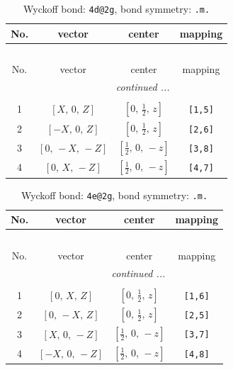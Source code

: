 \documentclass[fleqn,8pt]{jsarticle}
\begin{document}
\begin{longtable}{cccc}
\caption{Wyckoff bond: {\tt 4d@2g}, bond symmetry: {\tt .m.}}
 \\
 \hline \hline
No. & vector & center & mapping \\ \hline \endfirsthead

\multicolumn{3}{l}{\tablename\ \thetable{}} \\
 \hline \hline
No. & vector & center & mapping \\ \hline \endhead

 \hline \hline
\multicolumn{3}{r}{\footnotesize\it continued ...} \\ \endfoot

 \hline \hline
\multicolumn{3}{r}{} \\ \endlastfoot

1 & $\left[ X,\, 0,\, Z \right]$ & $\left[ 0,\, \frac{1}{2},\, z \right]$ & {\tt [1,5]} \\ \hline
2 & $\left[ - X,\, 0,\, Z \right]$ & $\left[ 0,\, \frac{1}{2},\, z \right]$ & {\tt [2,6]} \\ \hline
3 & $\left[ 0,\, - X,\, - Z \right]$ & $\left[ \frac{1}{2},\, 0,\, - z \right]$ & {\tt [3,8]} \\ \hline
4 & $\left[ 0,\, X,\, - Z \right]$ & $\left[ \frac{1}{2},\, 0,\, - z \right]$ & {\tt [4,7]} \\
\end{longtable}
\renewcommand{\arraystretch}{1.2}
\begin{longtable}{cccc}
\caption{Wyckoff bond: {\tt 4e@2g}, bond symmetry: {\tt .m.}}
 \\
 \hline \hline
No. & vector & center & mapping \\ \hline \endfirsthead

\multicolumn{3}{l}{\tablename\ \thetable{}} \\
 \hline \hline
No. & vector & center & mapping \\ \hline \endhead

 \hline \hline
\multicolumn{3}{r}{\footnotesize\it continued ...} \\ \endfoot

 \hline \hline
\multicolumn{3}{r}{} \\ \endlastfoot

1 & $\left[ 0,\, X,\, Z \right]$ & $\left[ 0,\, \frac{1}{2},\, z \right]$ & {\tt [1,6]} \\ \hline
2 & $\left[ 0,\, - X,\, Z \right]$ & $\left[ 0,\, \frac{1}{2},\, z \right]$ & {\tt [2,5]} \\ \hline
3 & $\left[ X,\, 0,\, - Z \right]$ & $\left[ \frac{1}{2},\, 0,\, - z \right]$ & {\tt [3,7]} \\ \hline
4 & $\left[ - X,\, 0,\, - Z \right]$ & $\left[ \frac{1}{2},\, 0,\, - z \right]$ & {\tt [4,8]} \\
\end{longtable}
\end{document}
